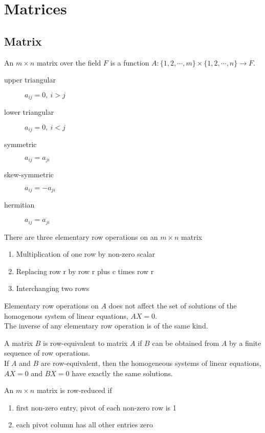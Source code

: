 \chapter{Matrices}
\section{Matrix}
	\begin{definition}
		An $m \times n$ matrix over the field $F$ is a function $A : \{1,2,\cdots,m\} \times \{1,2,\cdots,n\} \to F$.
	\end{definition}
	\begin{description}
		\item[upper triangular] $a_{ij} = 0,\ i>j$
		\item[lower triangular] $a_{ij} = 0,\ i<j$
		\item[symmetric] $a_{ij} = a_{ji}$
		\item[skew-symmetric] $a_{ij} = -a_{ji}$
		\item[hermitian] $a_{ij} = \overline{a_{ji}}$
	\end{description}
	\begin{remark}
		There are three elementary row operations on an $m \times n$ matrix
		\begin{enumerate}
			\item Multiplication of one row by non-zero scalar
			\item Replacing row r by row r plus c times row r
			\item Interchanging two rows
		\end{enumerate}
	\end{remark}
	\begin{remark}
		Elementary row operations on $A$ does not affect the set of solutions of the homogenous system of linear equations, $AX = 0$.\\
		The inverse of any elementary row operation is of the same kind.
	\end{remark}
	\begin{definition}
		A matrix $B$ is row-equivalent to matrix $A$ if $B$ can be obtained from $A$ by a finite sequence of row operations.\\
		If $A$ and $B$ are row-equivalent, then the homogeneous systems of linear equations, $AX = 0$ and $BX=0$ have exactly the same solutions.
	\end{definition}
	\begin{definition}
		An $m \times n$ matrix is row-reduced if
		\begin{enumerate}
			\item first non-zero entry, pivot of each non-zero row is 1
			\item each pivot column has all other entries zero 
		\end{enumerate}
	\end{definition}
